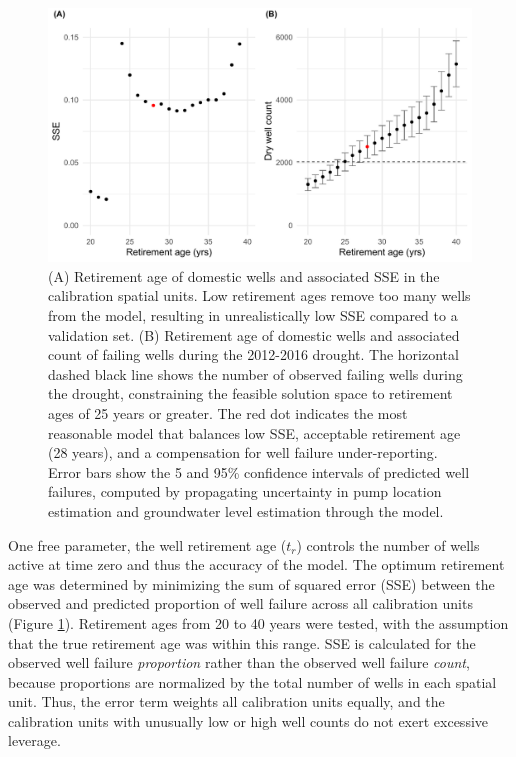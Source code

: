 \begin{figure}[ht]
	\includegraphics[width=\textwidth]{ch2_appendix_figs/erl_p_calib_err_GF.pdf}
	\caption{(A) Retirement age of domestic wells and associated SSE in the calibration spatial units. Low retirement ages remove too many wells from the model, resulting in unrealistically low SSE compared to a validation set. (B) Retirement age of domestic wells and associated count of failing wells during the 2012-2016 drought. The horizontal dashed black line shows the number of observed failing wells during the drought, constraining the feasible solution space to retirement ages of 25 years or greater. The red dot indicates the most reasonable model that balances low SSE, acceptable retirement age (28 years), and a compensation for well failure under-reporting. Error bars show the 5 and 95\% confidence intervals of predicted well failures, computed by propagating uncertainty in pump location estimation and groundwater level estimation through the model.}
	\label{fig:calib_err}
\end{figure}

One free parameter, the well retirement age ($t_r$) controls the number of wells active at time zero and thus the accuracy of the model. The optimum retirement age was determined by minimizing the sum of squared error (SSE) between the observed and predicted proportion of well failure across all calibration units (Figure \ref{fig:calib_err}). Retirement ages from 20 to 40 years were tested, with the assumption that the true retirement age was within this range. SSE is calculated for the observed well failure \textit{proportion} rather than the observed well failure \textit{count}, because proportions are normalized by the total number of wells in each spatial unit. Thus, the error term weights all calibration units equally, and the calibration units with unusually low or high well counts do not exert excessive leverage.  


